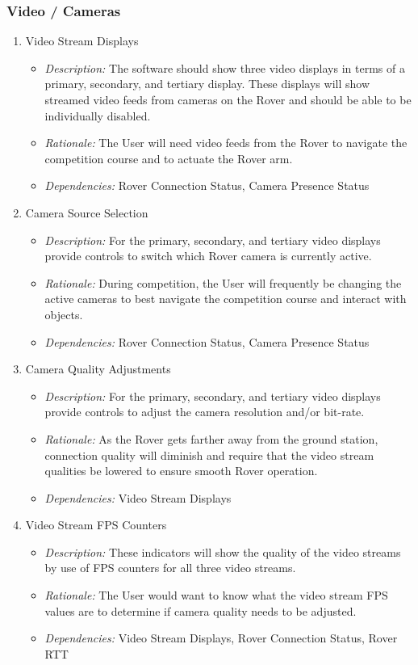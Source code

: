 \documentclass[onecolumn, draftclsnofoot, 10pt, compsoc]{IEEEtran}
\newcommand{\functRequ}[4]{
\item #1%
\par
\begin{itemize}
\item \textit{Description:} #2.%
\item \textit{Rationale:} #3.%
\item \textit{Dependencies:} #4%
\end{itemize}
}
\begin{document}
\subsubsection{Video / Cameras}
\begin{enumerate}
\functRequ{Video Stream Displays}
{The software should show three video displays in terms of a primary, secondary, and tertiary display.
These displays will show streamed video feeds from cameras on the Rover and should be able to be individually disabled}
{The User will need video feeds from the Rover to navigate the competition course and to actuate the Rover arm}
{Rover Connection Status, Camera Presence Status}


\functRequ{Camera Source Selection}
{For the primary, secondary, and tertiary video displays provide controls to switch which Rover camera is currently active}
{During competition, the User will frequently be changing the active cameras to best navigate the competition course and interact with objects}
{Rover Connection Status, Camera Presence Status}

\functRequ{Camera Quality Adjustments}
{For the primary, secondary, and tertiary video displays provide controls to adjust the camera resolution and/or bit-rate}
{As the Rover gets farther away from the ground station, connection quality will diminish and require that the video stream qualities be lowered to ensure smooth Rover operation}
{Video Stream Displays}

\functRequ{Video Stream FPS Counters}
{These indicators will show the quality of the video streams by use of FPS counters for all three video streams}
{The User would want to know what the video stream FPS values are to determine if camera quality needs to be adjusted}
{Video Stream Displays, Rover Connection Status, Rover RTT}
\end{enumerate}
\end{document}
